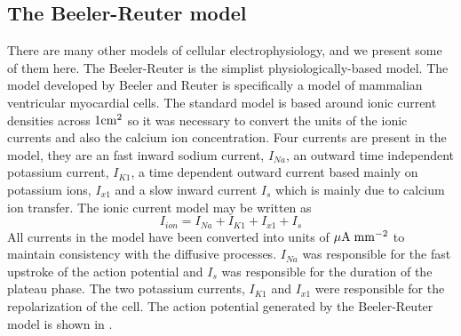\subsection{The Beeler-Reuter model}
\label{sec:The_Beeler-Reuter_model}
There are many other models of cellular electrophysiology, and we present some
of them here.  The Beeler-Reuter is the simplist physiologically-based model.
The model developed by Beeler and Reuter \cite{beeler:1977} is specifically a model of
mammalian ventricular myocardial cells. The standard model is based around
ionic current densities across $1 \mathrm{cm}^2$ so it was necessary to convert the
units of the ionic currents and also the calcium ion concentration. Four
currents are present in the model, they are an fast inward sodium current,
$I_{Na}$, an outward time independent potassium current, $I_{K1}$, a time
dependent outward current based mainly on potassium ions, $I_{x1}$ and a slow
inward current $I_{s}$ which is 
mainly due to calcium ion transfer. The ionic current model may be written as
\begin{equation}
  I_{ion} = I_{Na} + I_{K1} + I_{x1} + I_{s}
  \label{eqn:BeelerReuter_ionic_current_model}
\end{equation}
All currents in the model have been converted into units of
$\mathrm{\mu A}\thickspace\mathrm{mm}^{-2}$ to maintain consistency with the diffusive
processes. $I_{Na}$ was responsible for the fast upstroke of the action
potential and $I_s$ was responsible for the duration of the plateau phase. The
two potassium currents, $I_{K1}$ and $I_{x1}$ were responsible for the
repolarization of the cell. The action potential generated by the
Beeler-Reuter model is shown in .

